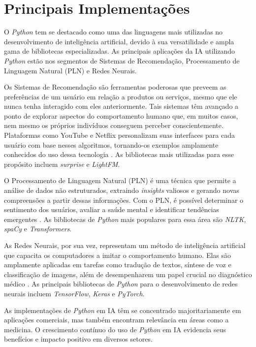 \chapter{Principais Implementações}

O \textit{Python} tem se destacado como uma das linguagens mais utilizadas no desenvolvimento de inteligência artificial, devido à sua versatilidade e ampla gama de bibliotecas especializadas. As principais aplicações da IA utilizando \textit{Python} estão nos segmentos de Sistemas de Recomendação, Processamento de Linguagem Natural (PLN) e Redes Neurais.

Os Sistemas de Recomendação são ferramentas poderosas que preveem as preferências de um usuário em relação a produtos ou serviços, mesmo que ele nunca tenha interagido com eles anteriormente. Tais sistemas têm avançado a ponto de explorar aspectos do comportamento humano que, em muitos casos, nem mesmo os próprios indivíduos conseguem perceber conscientemente. Plataformas como YouTube e Netflix personalizam suas interfaces para cada usuário com base nesses algoritmos, tornando-os exemplos amplamente conhecidos do uso dessa tecnologia \cite{didatica2024}. As bibliotecas mais utilizadas para esse propósito incluem \textit{surprise} e \textit{LightFM}.

O Processamento de Linguagem Natural (PLN) é uma técnica que permite a análise de dados não estruturados, extraindo \textit{insights} valiosos e gerando novas compreensões a partir dessas informações. Com o PLN, é possível determinar o sentimento dos usuários, avaliar a saúde mental e identificar tendências emergentes \cite{google2024}. As bibliotecas de \textit{Python} mais populares para essa área são \textit{NLTK}, \textit{spaCy} e \textit{Transformers}.

As Redes Neurais, por sua vez, representam um método de inteligência artificial que capacita os computadores a imitar o comportamento humano. Elas são amplamente aplicadas em tarefas como tradução de textos, síntese de voz e classificação de imagens, além de desempenharem um papel crucial no diagnóstico médico \cite{aws2024}. As principais bibliotecas de \textit{Python} para o desenvolvimento de redes neurais incluem \textit{TensorFlow}, \textit{Keras} e \textit{PyTorch}.

As implementações de \textit{Python} em IA têm se concentrado majoritariamente em aplicações comerciais, mas também encontram relevância em áreas como a medicina. O crescimento contínuo do uso de \textit{Python} em IA evidencia seus benefícios e impacto positivo em diversos setores.